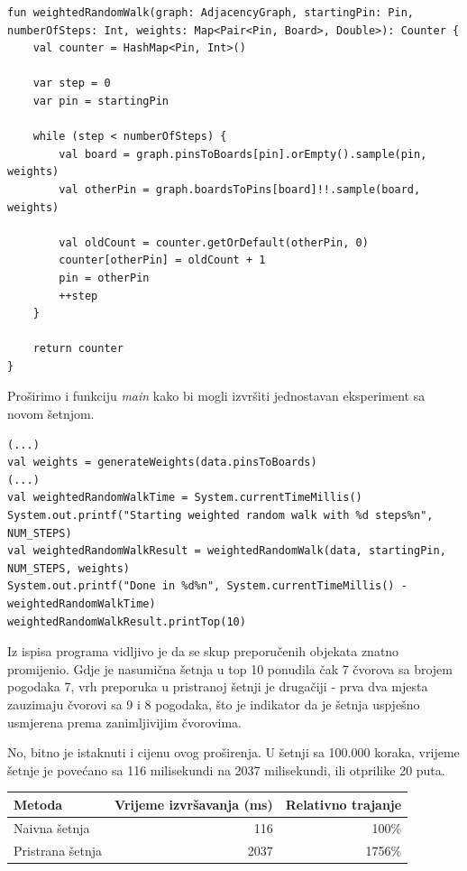 \documentclass[times, utf8, seminar]{fer}
\begin{document}
\begin{lstlisting}
fun weightedRandomWalk(graph: AdjacencyGraph, startingPin: Pin, numberOfSteps: Int, weights: Map<Pair<Pin, Board>, Double>): Counter {
    val counter = HashMap<Pin, Int>()

    var step = 0
    var pin = startingPin

    while (step < numberOfSteps) {
        val board = graph.pinsToBoards[pin].orEmpty().sample(pin, weights)
        val otherPin = graph.boardsToPins[board]!!.sample(board, weights)

        val oldCount = counter.getOrDefault(otherPin, 0)
        counter[otherPin] = oldCount + 1
        pin = otherPin
        ++step
    }

    return counter
}
\end{lstlisting}

Proširimo i funkciju \textit{main} kako bi mogli izvršiti jednostavan eksperiment sa novom šetnjom.

\begin{lstlisting}
(...)
val weights = generateWeights(data.pinsToBoards)
(...)
val weightedRandomWalkTime = System.currentTimeMillis()
System.out.printf("Starting weighted random walk with %d steps%n", NUM_STEPS)
val weightedRandomWalkResult = weightedRandomWalk(data, startingPin, NUM_STEPS, weights)
System.out.printf("Done in %d%n", System.currentTimeMillis() - weightedRandomWalkTime)
weightedRandomWalkResult.printTop(10)
\end{lstlisting}

Iz ispisa programa vidljivo je da se skup preporučenih objekata znatno promijenio. Gdje je nasumična šetnja u top 10 ponudila čak 7 čvorova sa brojem pogodaka 7, vrh preporuka u pristranoj šetnji je drugačiji - prva dva mjesta zauzimaju čvorovi sa 9 i 8 pogodaka, što je indikator da je šetnja uspješno usmjerena prema zanimljivijim čvorovima.

No, bitno je istaknuti i cijenu ovog proširenja. U šetnji sa 100.000 koraka, vrijeme šetnje je povećano sa 116 milisekundi na 2037 milisekundi, ili otprilike 20 puta.

\begin{center}
		  \begin{tabular}{ |l|r|r| }
					 \hline
					 Metoda & Vrijeme izvršavanja (ms) & Relativno trajanje\\
					 \hline
					 Naivna šetnja & 116 & 100\% \\
					 \hline
					 Pristrana šetnja & 2037 & 1756\% \\
					 \hline
		  \end{tabular}
\end{center}
\end{document}
